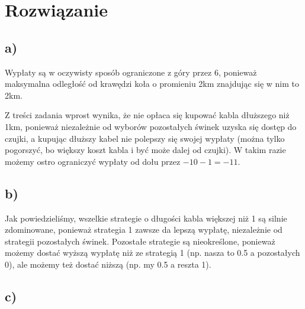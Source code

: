 \documentclass{article}
\begin{document}
\section{Rozwiązanie}

\subsection*{a)}

Wypłaty są w oczywisty sposób ograniczone z góry przez 6, ponieważ maksymalna odległość od krawędzi koła o promieniu 2km znajdując się w nim to 2km.

Z treści zadania wprost wynika, że nie opłaca się kupować kabla dłuższego niż 1km, ponieważ niezależnie od wyborów pozostałych świnek uzyska się dostęp do czujki, a kupując dłuższy kabel nie polepszy się swojej wypłaty (można tylko pogorszyć, bo większy koszt kabla i być może dalej od czujki). W takim razie możemy ostro ograniczyć wypłaty od dołu przez $-10-1 = -11$.

\subsection*{b)}

Jak powiedzieliśmy, wszelkie strategie o długości kabla większej niż 1 są silnie zdominowane, ponieważ strategia 1 zawsze da lepszą wypłatę, niezależnie od strategii pozostałych świnek. Pozostałe strategie są nieokreślone, ponieważ możemy dostać wyższą wypłatę niż ze strategią 1 (np. nasza to 0.5 a pozostałych 0), ale możemy też dostać niższą (np. my 0.5 a reszta 1).

\subsection*{c)}
\end{document}
